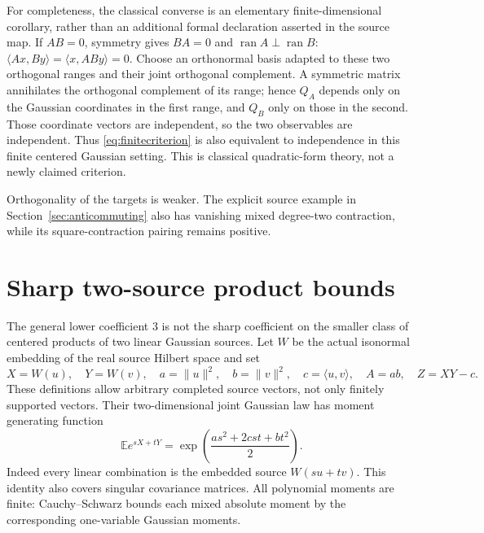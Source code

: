 \documentclass[11pt]{article}
\newcommand{\E}{\mathbb E}
\begin{document}
For completeness, the classical converse is an elementary
finite-dimensional corollary, rather than an additional formal
declaration asserted in the source map. If $AB=0$, symmetry gives
$BA=0$ and $\operatorname{ran}A\perp\operatorname{ran}B$:
$\langle Ax,By\rangle=\langle x,ABy\rangle=0$.
Choose an orthonormal basis adapted to these two orthogonal ranges
and their joint orthogonal complement. A symmetric matrix
annihilates the orthogonal complement of its range; hence $Q_A$
depends only on the Gaussian coordinates in the first range, and
$Q_B$ only on those in the second. Those coordinate vectors are
independent, so the two observables are independent. Thus
\eqref{eq:finitecriterion} is also equivalent to independence in
this finite centered Gaussian setting. This is classical
quadratic-form theory, not a newly claimed criterion.

Orthogonality of the targets is weaker. The explicit source example in
Section~\ref{sec:anticommuting} also has vanishing mixed degree-two
contraction, while its square-contraction pairing remains positive.

\section{Sharp two-source product bounds}\label{sec:twosource}
The general lower coefficient $3$ is not the sharp coefficient on the
smaller class of centered products of two linear Gaussian sources.
Let $W$ be the actual isonormal embedding of the real source Hilbert
space and set
\[
 X=W(u),\quad Y=W(v),\quad a=\|u\|^2,\quad b=\|v\|^2,
 \quad c=\langle u,v\rangle,\quad A=ab,\quad Z=XY-c.
\]
These definitions allow arbitrary completed source vectors, not only
finitely supported vectors. Their two-dimensional joint Gaussian law
has moment generating function
\[
 \E e^{sX+tY}=\exp\!\left(\frac{as^2+2cst+bt^2}{2}\right).
\]
Indeed every linear combination is the embedded source $W(su+tv)$.
This identity also covers singular covariance matrices. All polynomial
moments are finite: Cauchy--Schwarz bounds each mixed absolute moment
by the corresponding one-variable Gaussian moments.
\end{document}
